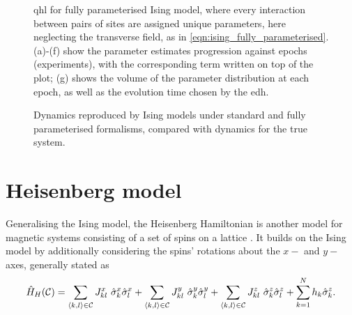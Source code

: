 \begin{figure}
    \begin{center}
    \end{center}
    \caption[\gls{qhl} for Ising model]{
        \gls{qhl} for fully parameterised Ising model, 
            where every interaction between pairs of sites are assigned unique parameters, 
            here neglecting the transverse field, 
            as in \cref{eqn:ising_fully_parameterised}. 
        (a)-(f) show the parameter estimates progression against 
        epochs (experiments), with the corresponding term written on top of the plot; 
        (g) shows the \gls{volume} of the parameter distribution at each epoch, as well as the 
        evolution time chosen by the \gls{edh}. 
        \figtableref
    }
    \label{fig:ising_fully_parameterised}
\end{figure}

\begin{figure}
    \begin{center}
    \end{center}
    \caption[Ising model types' dynamics.]{
        Dynamics reproduced by Ising models under standard and fully parameterised formalisms, 
        compared with dynamics for the true system.     
    }
    \label{fig:ising_model_types_dynamics}
\end{figure}



\section{Heisenberg model}\label{sec:heisenberg}
Generalising the Ising model, the Heisenberg Hamiltonian is another model for magnetic systems consisting of a set of 
    spins on a lattice \cite{greiner2012thermodynamics}. 
It builds on the Ising model by additionally considering the spins' rotations about the $x-$ and $y-$ axes, generally stated as 
\begin{equation}
    \label{eqn:heisenberg_model_general}
    \hat{H}_H({ \mathcal{C}}) = 
    \sum\limits_{{ \langle k, l \rangle } \in { \mathcal{C}}} J^x_{kl} \  \hat{\sigma}^x_k \hat{\sigma}^x_l
    + \sum\limits_{{ \langle k, l \rangle } \in { \mathcal{C}}} J^y_{kl} \ \hat{\sigma}^y_k \hat{\sigma}^y_l
    + \sum\limits_{{ \langle k, l \rangle } \in { \mathcal{C}}} J^z_{kl} \ \hat{\sigma}^z_k \hat{\sigma}^z_l
    + \sum\limits_{k=1}^{N} h_k \hat{\sigma}^z_k.
\end{equation}

